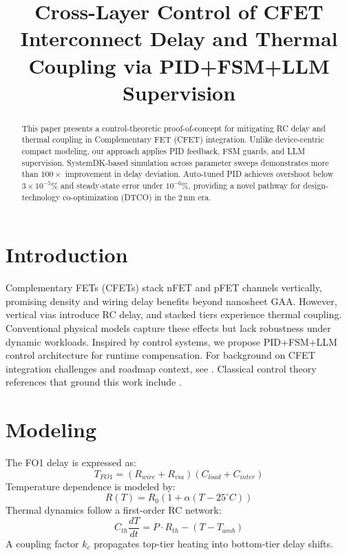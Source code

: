 \documentclass[conference]{IEEEtran}
\title{Cross-Layer Control of CFET Interconnect Delay and Thermal Coupling via PID+FSM+LLM Supervision}
\author{
  \IEEEauthorblockN{Shinichi Samizo}
  \IEEEauthorblockA{Independent Semiconductor Researcher\\
  Email: \href{mailto:shin3t72@gmail.com}{shin3t72@gmail.com}}
}
\begin{document}
\maketitle

\begin{abstract}
This paper presents a control-theoretic proof-of-concept
for mitigating RC delay and thermal coupling in Complementary FET (CFET) integration.
Unlike device-centric compact modeling, our approach applies PID feedback, FSM guards,
and LLM supervision. SystemDK-based simulation across parameter sweeps demonstrates
more than $100\times$ improvement in delay deviation. Auto-tuned PID achieves overshoot
below $3\times 10^{-5}\%$ and steady-state error under $10^{-6}\%$, providing a novel pathway
for design-technology co-optimization (DTCO) in the 2\,nm era.
\end{abstract}

\section{Introduction}
Complementary FETs (CFETs) stack nFET and pFET channels vertically,
promising density and wiring delay benefits beyond nanosheet GAA.
However, vertical vias introduce RC delay, and stacked tiers experience
thermal coupling. Conventional physical models capture these effects
but lack robustness under dynamic workloads. Inspired by control systems,
we propose PID+FSM+LLM control architecture for runtime compensation.
For background on CFET integration challenges and roadmap context, see \cite{yakimets2020cfet,irds2023}.
Classical control theory references that ground this work include \cite{franklin2015feedback,khalil2002nonlinear,anderson2007optimal}.

\section{Modeling}
The FO1 delay is expressed as:
\begin{equation}
T_{FO1} = (R_{wire}+R_{via})(C_{load}+C_{inter})
\end{equation}
Temperature dependence is modeled by:
\begin{equation}
R(T) = R_0 \left(1 + \alpha (T-25^\circ C)\right)
\end{equation}
Thermal dynamics follow a first-order RC network:
\begin{equation}
C_{th}\frac{dT}{dt} = P\cdot R_{th} - (T - T_{amb})
\end{equation}
A coupling factor $k_c$ propagates top-tier heating into bottom-tier delay shifts.
\end{document}
